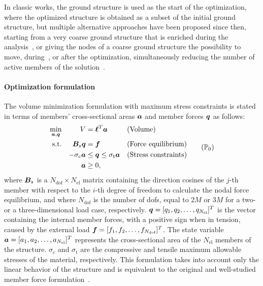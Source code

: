 In classic works, the ground structure is used as the start of the optimization, where the optimized structure is obtained as a subset of the initial ground structure, but multiple alternative approaches have been proposed since then, \eg starting from a very coarse ground structure that is enriched during the analysis~, or giving the nodes of a coarse ground structure the possibility to move, during~, or after the optimization, simultaneously reducing the number of active members of the solution~.

\paragraph{Optimization formulation}
The volume minimization formulation with maximum stress constraints is stated in terms of members' cross-sectional areas $\bm{a}$ and member forces $\bm{q}$ as follows:
\begin{equation}
    \begin{aligned}
    \min_{\vect{a}, \vect{q}}   && V &= \vect{\ell}^{T}\vect{a} && \textrm{(Volume)}\\
    \textrm{s.t.}   && \matr{B}_s\vect{q} &= \vect{f} && \textrm{(Force equilibrium)}\\
    && -\sigma_\text{c}\vect{a} &\leq \vect{q} \leq \sigma_\text{t}\vect{a} && \textrm{(Stress constraints)} \\
    && \vect{a} &\geq 0, \\
    \end{aligned}
    \tag{$\mathbb{P}_0$}
    \label{eq:03_optim_original}
\end{equation}
where $\bm{B}_s$ is a $N_{\text{dof}} \times N_{\text{el}}$ matrix containing the direction cosines of the $j$-th member with respect to the $i$-th degree of freedom to calculate the nodal force equilibrium, and where $N_{\text{dof}}$ is the number of \gls{dofs}, equal to $2M$ or $3M$ for a two- or a three-dimensional load case, respectively. $\bm{q} = [q_1, q_2, \ldots,q_{N_{\text{el}}}]^T$ is the vector containing the internal member forces, with a positive sign when in tension, caused by the external load $\bm{f} = [f_1, f_2, \ldots,f_{N_{\text{dof}}}]^T$. The state variable $\bm{a} = [a_1, a_2, \ldots,a_{N_{\text{el}}}]^T$ represents the cross-sectional area of the $N_{\text{el}}$ members of the structure. $\sigma_\text{c}$ and $\sigma_\text{t}$ are the compressive and tensile maximum allowable stresses of the material, respectively. This formulation takes into account only the linear behavior of the structure and is equivalent to the original and well-studied member force formulation~.


